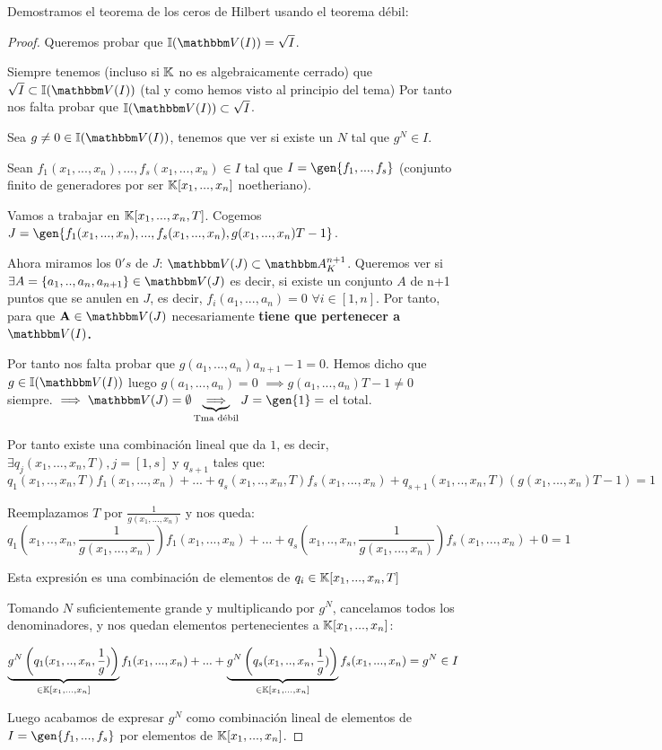 Demostramos el teorema de los ceros de Hilbert usando el teorema débil:
\begin{proof}
	Queremos probar que $\I(\V(I))=\sqrt{I}$.

	Siempre tenemos (incluso si $\mathbb{K}$ no es algebraicamente cerrado) que $\sqrt{I} \subset \I(\V(I))$ (tal y como hemos visto al principio del tema) Por tanto nos falta probar que $\I(\V(I)) \subset \sqrt{I}$.

	Sea $g \neq 0 \in \I(\V(I))$, tenemos que ver si existe un $N$ tal que $g^N \in I$.

	Sean $f_1(x_1,...,x_n),...,f_s(x_1,...,x_n) \in I$ tal que $I=\gen{f_1,...,f_s}$ (conjunto finito de generadores por ser $\mathbb{K}[x_1,...,x_n]$ noetheriano).

	Vamos a trabajar en $\mathbb{K}[x_1,...,x_n,T]$. Cogemos $J=\gen{f_1(x_1,...,x_n),...,f_s(x_1,...,x_n), g(x_1,...,x_n)T-1}$.

	Ahora miramos los $0's$ de $J$: $\V(J) \subset \A^{n+1}_K$. Queremos ver si $\exists A=\{a_1,..,a_n,a_{n+1} \} \in \V(J)$ es decir, si existe un conjunto $A$ de n+1 puntos que se anulen en $J$, es decir, $f_i(a_1,...,a_n)=0$ $\forall i \in [1,n]$. Por tanto, para que $\textbf{A} \in \V(J)$ necesariamente \textbf{tiene que pertenecer a $\V(I)$.}

	Por tanto nos falta probar que $g(a_1,...,a_n)a_{n+1}-1=0$. Hemos dicho que $g \in \I(\V(I))$ luego $g(a_1,...,a_n)=0$ $\implies g(a_1,...,a_n)T-1\neq 0$ siempre. $\implies \V(J)=\emptyset \underbrace{\implies}_{\text{Tma débil}} J=\gen{1}=$ el total.

	Por tanto existe una combinación lineal que da $1$, es decir,  $\exists q_j(x_1,...,x_n,T), j=[1,s]$ y $q_{s+1}$ tales que:
	$$ q_1(x_1,..,x_n,T)f_1(x_1,...,x_n)+...+q_s(x_1,..,x_n,T)f_s(x_1,...,x_n) + q_{s+1}(x_1,..,x_n,T)(g(x_1,...,x_n)T-1)=1 $$

	Reemplazamos $T$ por $\frac{1}{g(x_1,...,x_n)}$ y nos queda:
	$$ q_1(x_1,..,x_n, \frac{1}{g(x_1,...,x_n)})f_1(x_1,...,x_n)+...+q_s(x_1,..,x_n,\frac{1}{g(x_1,...,x_n)})f_s(x_1,...,x_n)+0=1 $$

	Esta expresión es una combinación de elementos de $q_i \in \mathbb{K}[x_1,...,x_n,T]$

	Tomando $N$ suficientemente grande y multiplicando por $g^N$, cancelamos todos los denominadores, y nos quedan elementos pertenecientes a $\mathbb{K}[x_1,...,x_n]$:

	$$ \underbrace{g^N\left(q_1(x_1,..,x_n, \frac{1}{g})\right)}_{\in \mathbb{K}[x_1,...,x_n]}f_1(x_1,...,x_n)+...+ \underbrace{g^N \left( q_s(x_1,..,x_n,\frac{1}{g})\right)}_{\in \mathbb{K}[x_1,...,x_n]}f_s(x_1,...,x_n) =g^N \in I $$

	Luego acabamos de expresar $g^N$ como combinación lineal de elementos de $I=\gen{f_1,...,f_s}$ por elementos de $\mathbb{K}[x_1,...,x_n]$.
\end{proof}


